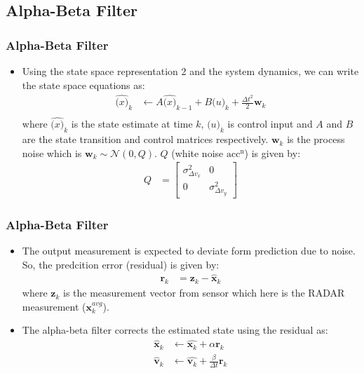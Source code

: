\documentclass{beamer}
\begin{document}
\subsection{Alpha-Beta Filter}
\begin{frame}
\frametitle{Alpha-Beta Filter}
\begin{itemize}
    \item Using the state space representation 2 and the system dynamics, we can write the state space equations as:
    \begin{align*}
        \hat{\mathbf(x)}_k &\leftarrow A \hat{\mathbf(x)}_{k-1} + B \mathbf(u)_k + \frac{\Delta t^2}{2}\mathbf{w}_k \\
    \end{align*}
    where $\hat{\mathbf(x)}_k$ is the state estimate at time $k$, $\mathbf(u)_k$ is control input and $A$ and $B$ are the state transition and control matrices respectively. 
    $\mathbf{w}_k$ is the process noise which is $\mathbf{w}_k \sim \mathcal{N}(0, Q)$. $Q$ (white noise $\text{acc}^{\text{n}}$) is given by:
    \begin{align*}
        Q &= \begin{bmatrix}
            \sigma^2_{\Delta v_x} & 0 \\
            0 & \sigma^2_{\Delta v_y}
        \end{bmatrix}
    \end{align*}
\end{itemize}
\end{frame}

\begin{frame}
\frametitle{Alpha-Beta Filter}
\begin{itemize}
\item The output measurement is expected to deviate form prediction due to noise. So, the predcition error (residual) is given by:
\begin{align*}
    \mathbf{r}_k &= \mathbf{z}_k - \hat{\mathbf{x}}_k
\end{align*}
where $\mathbf{z}_k$ is the measurement vector from sensor which here is the RADAR measurement ($\mathbf{x}^{avg}_k$).
\item The alpha-beta filter corrects the estimated state using the residual as:
\begin{align*}
    \hat{\mathbf{x}}_k &\leftarrow \hat{\mathbf{x}_k} + \alpha \mathbf{r}_k \\
    \hat{\mathbf{v}}_k &\leftarrow \hat{\mathbf{v}_k} + \frac{\beta}{\Delta t} \mathbf{r}_k
\end{align*}
\end{itemize}
\end{frame}
\end{document}
